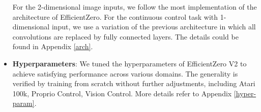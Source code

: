 \begin{itemize}
    For the 2-dimensional image inputs, we follow the most implementation of the architecture of EfficientZero. For the continuous control task with 1-dimensional input, we use a variation of the previous architecture in which all convolutions are replaced by fully connected layers. The details could be found in Appendix \ref{arch}.
    \item \textbf{Hyperparameters}: We tuned the hyperparameters of EfficientZero V2 to achieve satisfying performance across various domains. The generality is verified by training from scratch without further adjustments, including Atari 100k, Proprio Control, Vision Control. More details refer to Appendix \ref{hyper-param}.
\end{itemize}



